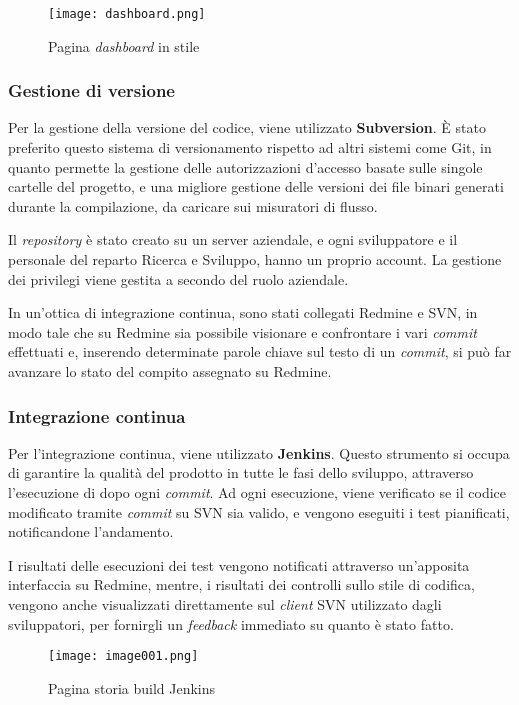 \begin{figure}[H]
  \centering
  \texttt{[image: dashboard.png]}
  \caption{Pagina \textit{dashboard} in stile \textit{}}
\end{figure}

\subsubsection*{Gestione di versione} 

Per la gestione della versione del codice, viene utilizzato \textbf{Subversion}. 
È stato preferito questo sistema di versionamento rispetto ad altri sistemi come Git, in quanto permette la gestione delle autorizzazioni d'accesso basate sulle singole cartelle del progetto, e una migliore gestione delle versioni dei file binari generati durante la compilazione, da caricare sui misuratori di flusso.

Il \textit{repository} è stato creato su un server aziendale, e ogni sviluppatore e il personale del reparto Ricerca e Sviluppo, hanno un proprio account. La gestione dei privilegi viene gestita a secondo del ruolo aziendale.

In un'ottica di integrazione continua, sono stati collegati Redmine e SVN, in modo tale che su Redmine sia possibile visionare e confrontare i vari \textit{commit} effettuati e,  inserendo determinate parole chiave sul testo di un \textit{commit}, si può far avanzare lo stato del compito assegnato su Redmine.

\subsubsection*{Integrazione continua}

Per l'integrazione continua, viene utilizzato \textbf{Jenkins}.
Questo strumento si occupa di garantire la qualità del prodotto in tutte le fasi dello sviluppo, attraverso l'esecuzione di \textit{} dopo ogni \textit{commit}.
Ad ogni esecuzione, viene verificato se il codice modificato tramite \textit{commit} su SVN sia valido, e vengono eseguiti i test pianificati, notificandone l'andamento.

I risultati delle esecuzioni dei test vengono notificati attraverso un'apposita interfaccia su Redmine, mentre, i risultati dei controlli sullo stile di codifica, vengono anche visualizzati direttamente sul \textit{client} SVN utilizzato dagli sviluppatori, per fornirgli un \textit{feedback} immediato su quanto è stato fatto. 
\begin{figure}[H]
  \centering
  \texttt{[image: image001.png]}
  \caption{Pagina storia build Jenkins}
\end{figure}
